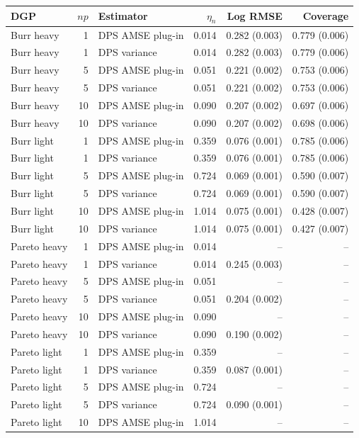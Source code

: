 \begin{tabular}{lrlrrr}
\toprule
DGP & $np$ & Estimator & $\eta_n$ & Log RMSE & Coverage \\
\midrule
Burr heavy & 1 & DPS AMSE plug-in & 0.014 & 0.282 (0.003) & 0.779 (0.006) \\
Burr heavy & 1 & DPS variance & 0.014 & 0.282 (0.003) & 0.779 (0.006) \\
Burr heavy & 5 & DPS AMSE plug-in & 0.051 & 0.221 (0.002) & 0.753 (0.006) \\
Burr heavy & 5 & DPS variance & 0.051 & 0.221 (0.002) & 0.753 (0.006) \\
Burr heavy & 10 & DPS AMSE plug-in & 0.090 & 0.207 (0.002) & 0.697 (0.006) \\
Burr heavy & 10 & DPS variance & 0.090 & 0.207 (0.002) & 0.698 (0.006) \\
Burr light & 1 & DPS AMSE plug-in & 0.359 & 0.076 (0.001) & 0.785 (0.006) \\
Burr light & 1 & DPS variance & 0.359 & 0.076 (0.001) & 0.785 (0.006) \\
Burr light & 5 & DPS AMSE plug-in & 0.724 & 0.069 (0.001) & 0.590 (0.007) \\
Burr light & 5 & DPS variance & 0.724 & 0.069 (0.001) & 0.590 (0.007) \\
Burr light & 10 & DPS AMSE plug-in & 1.014 & 0.075 (0.001) & 0.428 (0.007) \\
Burr light & 10 & DPS variance & 1.014 & 0.075 (0.001) & 0.427 (0.007) \\
Pareto heavy & 1 & DPS AMSE plug-in & 0.014 & -- & -- \\
Pareto heavy & 1 & DPS variance & 0.014 & 0.245 (0.003) & -- \\
Pareto heavy & 5 & DPS AMSE plug-in & 0.051 & -- & -- \\
Pareto heavy & 5 & DPS variance & 0.051 & 0.204 (0.002) & -- \\
Pareto heavy & 10 & DPS AMSE plug-in & 0.090 & -- & -- \\
Pareto heavy & 10 & DPS variance & 0.090 & 0.190 (0.002) & -- \\
Pareto light & 1 & DPS AMSE plug-in & 0.359 & -- & -- \\
Pareto light & 1 & DPS variance & 0.359 & 0.087 (0.001) & -- \\
Pareto light & 5 & DPS AMSE plug-in & 0.724 & -- & -- \\
Pareto light & 5 & DPS variance & 0.724 & 0.090 (0.001) & -- \\
Pareto light & 10 & DPS AMSE plug-in & 1.014 & -- & -- \\

\end{tabular}
